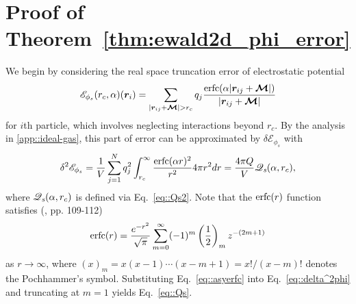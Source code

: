 \section{Proof of Theorem~\ref{thm:ewald2d_phi_error}}\label{app:phierr}
We begin by considering the real space truncation error of electrostatic potential 
\begin{equation}
	\mathscr{E}_{\phi_{s}}(r_c,\alpha)(\bm{r}_{i}) = \sum_{|\bm{r}_{ij} + \V{\mathcal{M}}|>r_c}q_{j} \frac{\erfc(\alpha|\bm{r}_{ij} + \V{\mathcal{M}}|)}{|\bm{r}_{ij} + \V{\mathcal{M}}|}
\end{equation}
for $i$th particle, which involves neglecting interactions beyond $r_c$. By the analysis in \ref{app::ideal-gas}, this part of error can be approximated by $\delta\mathscr{E}_{\phi_{s}}$ with 
\begin{equation}\label{eq::delta^2phi}
	\delta^2\mathscr{E}_{\phi_{s}}=  \frac{1}{V}\sum_{j=1}^{N}q_{j}^2\int_{r_c}^{\infty}\frac{\operatorname{erfc}(\alpha r)^2}{r^2}4\pi r^2dr=\frac{4\pi Q}{V}\mathscr{Q}_{\emph{s}}(\alpha,r_c),
\end{equation}
where $\mathscr{Q}_{\emph{s}}(\alpha,r_c)$ is defined via Eq.~\eqref{eq::Qs2}. Note that the $\operatorname{erfc}(r)$ function satisfies (\cite{olver1997asymptotics}, pp. 109-112)
\begin{equation}\label{eq::asyerfc}
	\operatorname{erfc}(r)=\frac{e^{-r^2}}{\sqrt{\pi}}\sum_{m=0}^{\infty}(-1)^{m}\left(\frac{1}{2}\right)_mz^{-(2m+1)}
\end{equation}
as $r\rightarrow \infty$, where $(x)_m=x(x-1)\cdots(x-m+1)=x!/(x-m)!$ denotes the Pochhammer's symbol. Substituting Eq.~\eqref{eq::asyerfc} into Eq.~\eqref{eq::delta^2phi} and truncating at $m=1$ yields Eq.~\eqref{eq::Qs}. 


